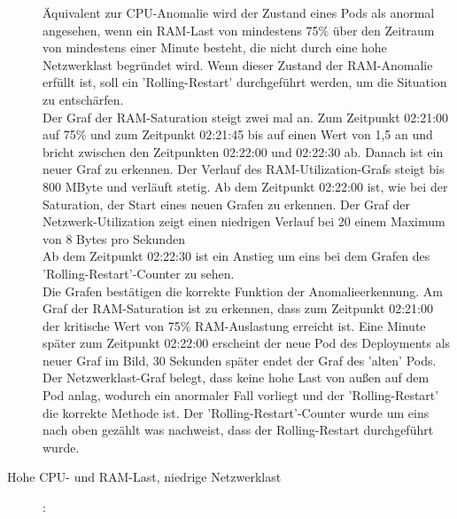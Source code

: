 \documentclass[a4paper,10pt]{scrartcl}
\begin{document}
\begin{description}
Äquivalent zur CPU-Anomalie wird der Zustand eines Pods als anormal angesehen, wenn ein RAM-Last von mindestens 75\% über den Zeitraum von mindestens einer Minute besteht, die nicht durch eine hohe Netzwerklast begründet wird. Wenn dieser Zustand  der RAM-Anomalie erfüllt ist, soll ein 'Rolling-Restart' durchgeführt werden, um die Situation zu entschärfen.\\
Der Graf der RAM-Saturation steigt zwei mal an. Zum Zeitpunkt 02:21:00 auf 75\% und zum Zeitpunkt 02:21:45 bis auf einen Wert von 1,5 an und bricht zwischen den Zeitpunkten 02:22:00 und 02:22:30 ab. Danach ist ein neuer Graf zu erkennen.
Der Verlauf des RAM-Utilization-Grafs steigt bis 800 MByte und verläuft stetig. Ab dem Zeitpunkt 02:22:00 ist, wie bei der Saturation, der Start eines neuen Grafen zu erkennen.
Der Graf der Netzwerk-Utilization zeigt einen niedrigen Verlauf bei 20 einem Maximum von 8 Bytes pro Sekunden\\
Ab dem Zeitpunkt 02:22:30 ist ein Anstieg um eins bei dem Grafen des 'Rolling-Restart'-Counter zu sehen.\\
Die Grafen bestätigen die korrekte Funktion der Anomalieerkennung. Am Graf der RAM-Saturation ist zu erkennen, dass zum Zeitpunkt 02:21:00 der kritische Wert von 75\% RAM-Auslastung erreicht ist. Eine Minute später zum Zeitpunkt 02:22:00 erscheint der neue Pod des Deployments als neuer Graf im Bild, 30 Sekunden später endet der Graf des 'alten' Pods. Der Netzwerklast-Graf belegt, dass keine hohe Last von außen auf dem Pod anlag, wodurch ein anormaler Fall vorliegt und der 'Rolling-Restart' die korrekte Methode ist.
Der 'Rolling-Restart'-Counter wurde um eins nach oben gezählt was nachweist, dass der Rolling-Restart durchgeführt wurde. 
\pagebreak

\item[Hohe CPU- und RAM-Last, niedrige Netzwerklast]:\\


\end{description}
\end{document}
